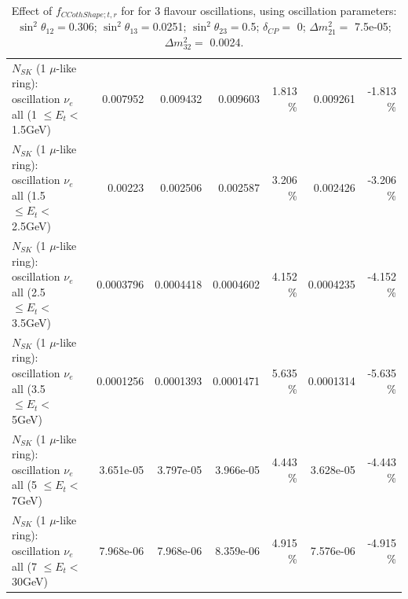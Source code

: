 \begin{table}
\begin{tabular}{| l | r | r | r  r | r  r |}
$N_{SK}$ (1 $\mu$-like ring): oscillation $\nu_{e}$ all (1 $\leq E_{t} <$ 1.5GeV) &        0.007952 &        0.009432 &        0.009603 &    1.813 \%  &        0.009261 &   -1.813 \%  \\ 
$N_{SK}$ (1 $\mu$-like ring): oscillation $\nu_{e}$ all (1.5 $\leq E_{t} <$ 2.5GeV) &         0.00223 &        0.002506 &        0.002587 &    3.206 \%  &        0.002426 &   -3.206 \%  \\ 
$N_{SK}$ (1 $\mu$-like ring): oscillation $\nu_{e}$ all (2.5 $\leq E_{t} <$ 3.5GeV) &       0.0003796 &       0.0004418 &       0.0004602 &    4.152 \%  &       0.0004235 &   -4.152 \%  \\ 
$N_{SK}$ (1 $\mu$-like ring): oscillation $\nu_{e}$ all (3.5 $\leq E_{t} <$ 5GeV) &       0.0001256 &       0.0001393 &       0.0001471 &    5.635 \%  &       0.0001314 &   -5.635 \%  \\ 
 $N_{SK}$ (1 $\mu$-like ring): oscillation $\nu_{e}$ all (5 $\leq E_{t} <$ 7GeV) &       3.651e-05 &       3.797e-05 &       3.966e-05 &    4.443 \%  &       3.628e-05 &   -4.443 \%  \\ 
$N_{SK}$ (1 $\mu$-like ring): oscillation $\nu_{e}$ all (7 $\leq E_{t} <$ 30GeV) &       7.968e-06 &       7.968e-06 &       8.359e-06 &    4.915 \%  &       7.576e-06 &   -4.915 \%  \\ 
\hline
\hline
\end{tabular}
\caption{ Effect of $f_{CCothShape; t, r}$ for for 3 flavour oscillations, using oscillation parameters:  $\sin^2\theta_{12} = $0.306; $\sin^2\theta_{13} = $0.0251; $\sin^2\theta_{23} = $0.5; $\delta_{CP} = $        0; $\Delta m^2_{21} = $    7.5e-05; $\Delta m^2_{32} = $    0.0024. }
\label{tab:num_xsec_shape_ccoth_1RmuT_3f_osc_t13:0.0251}
\end{table}
\clearpage
